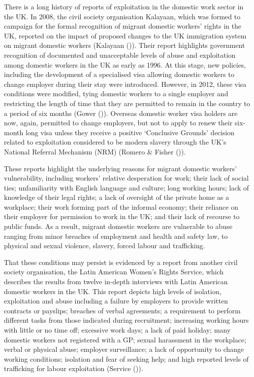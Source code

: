 \documentclass[
  12pt,
]{article}
\theoremstyle{plain}
\theoremstyle{definition}
\begin{document}
There is a long history of reports of exploitation in the domestic work
sector in the UK. In 2008, the civil society organisation Kalayaan,
which was formed to campaign for the formal recognition of migrant
domestic workers' rights in the UK, reported on the impact of proposed
changes to the UK immigration system on migrant domestic workers
(Kalayaan ()). Their report
highlights government recognition of documented and unacceptable levels
of abuse and exploitation among domestic workers in the UK as early as
1996. At this stage, new policies, including the development of a
specialised visa allowing domestic workers to change employer during
their stay were introduced. However, in 2012, these visa conditions were
modified, tying domestic workers to a single employer and restricting
the length of time that they are permitted to remain in the country to a
period of six months (Gower ()).
Overseas domestic worker visa holders are now, again, permitted to
change employers, but not to apply to renew their six-month long visa
unless they receive a positive `Conclusive Grounds' decision related to
exploitation considered to be modern slavery through the UK's National
Referral Mechanism (NRM) (Romero \& Fisher
()).

These reports highlight the underlying reasons for migrant domestic
workers' vulnerability, including workers' relative desperation for
work; their lack of social ties; unfamiliarity with English language and
culture; long working hours; lack of knowledge of their legal rights; a
lack of oversight of the private home as a workplace; their work forming
part of the informal economy; their reliance on their employer for
permission to work in the UK; and their lack of recourse to public
funds. As a result, migrant domestic workers are vulnerable to abuse
ranging from minor breaches of employment and health and safety law, to
physical and sexual violence, slavery, forced labour and trafficking.

That these conditions may persist is evidenced by a report from another
civil society organisation, the Latin American Women's Rights Service,
which describes the results from twelve in-depth interviews with Latin
American domestic workers in the UK. This report depicts high levels of
isolation, exploitation and abuse including a failure by employers to
provide written contracts or payslips; breaches of verbal agreements; a
requirement to perform different tasks from those indicated during
recruitment; increasing working hours with little or no time off;
excessive work days; a lack of paid holiday; many domestic workers not
registered with a GP; sexual harassment in the workplace; verbal or
physical abuse; employer surveillance; a lack of opportunity to change
working conditions; isolation and fear of seeking help; and high
reported levels of trafficking for labour exploitation (Service
()).
\end{document}
